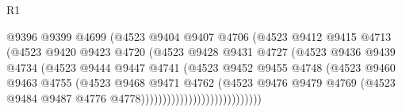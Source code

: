 \begin{lexlean}{R1}
\begin{coremodule}
                                      @9396
                                      @9399
                                      @4699
                                      (@4523
                                        @9404
                                        @9407
                                        @4706
                                        (@4523
                                          @9412
                                          @9415
                                          @4713
                                          (@4523
                                            @9420
                                            @9423
                                            @4720
                                            (@4523
                                              @9428
                                              @9431
                                              @4727
                                              (@4523
                                                @9436
                                                @9439
                                                @4734
                                                (@4523
                                                  @9444
                                                  @9447
                                                  @4741
                                                  (@4523
                                                    @9452
                                                    @9455
                                                    @4748
                                                    (@4523
                                                      @9460
                                                      @9463
                                                      @4755
                                                      (@4523
                                                        @9468
                                                        @9471
                                                        @4762
                                                        (@4523
                                                          @9476
                                                          @9479
                                                          @4769
                                                          (@4523
                                                            @9484
                                                            @9487
                                                            @4776
                                                            @4778))))))))))))))))))))))))))))

\end{coremodule}
\end{lexlean}
